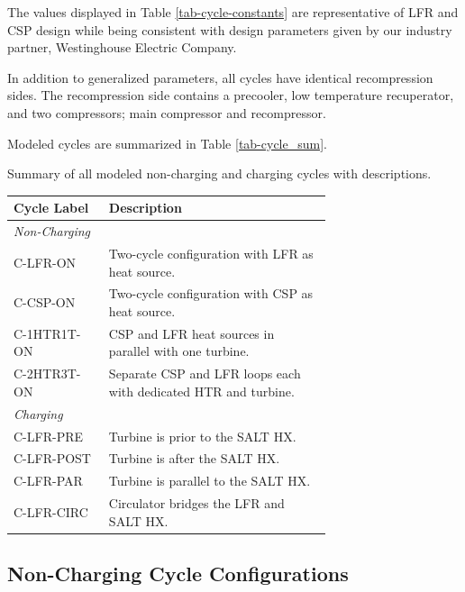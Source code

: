 \begin{paracol}{2}
The values displayed in Table \ref{tab-cycle-constants} are representative of LFR and CSP design while being consistent with design parameters given by our industry partner, Westinghouse Electric Company. 


In addition to generalized parameters, all cycles have identical recompression sides. The recompression side contains a precooler, low temperature recuperator, and two compressors; main compressor and recompressor. 

Modeled cycles are summarized in Table \ref{tab-cycle_sum}.

\begin{specialtable}[H] 
    \caption{Summary of all modeled non-charging and charging cycles with descriptions. \label{tab-cycle_sum}}
    \begin{tabular}{lL{0.7\linewidth}}
    \toprule
    \textbf{Cycle Label} & \textbf{Description}\\
    \midrule
    \textit{Non-Charging}\\
    C-LFR-ON & Two-cycle configuration with LFR as heat source.\\
    C-CSP-ON & Two-cycle configuration with CSP as heat source.\\
    C-1HTR1T-ON & CSP and LFR heat sources in parallel with one turbine.\\
    C-2HTR3T-ON & Separate CSP and LFR loops each with dedicated HTR and turbine.\\
    \midrule
    \textit{Charging}\\
    C-LFR-PRE & Turbine is prior to the SALT HX.\\
    C-LFR-POST & Turbine is after the SALT HX.\\
    C-LFR-PAR & Turbine is parallel to the SALT HX.\\
    C-LFR-CIRC & Circulator bridges the LFR and SALT HX.\\
    \bottomrule
    \end{tabular}
\end{specialtable}

\subsection{Non-Charging Cycle Configurations} 


\end{paracol}
